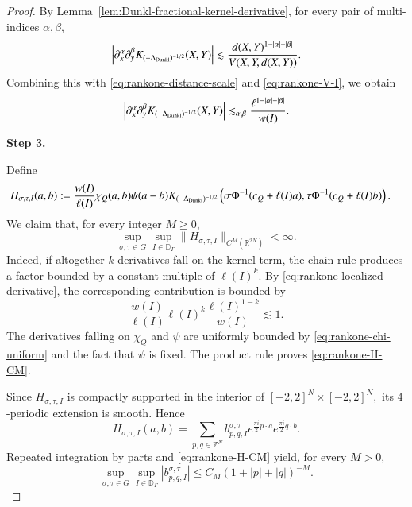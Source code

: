 \documentclass[12pt]{amsart}
\begin{document}
\begin{proof}
By Lemma~\ref{lem:Dunkl-fractional-kernel-derivative},
for every pair of multi-indices $\alpha,\beta$,
\[
\left|
\partial_x^\alpha\partial_y^\beta
K_{(-\Delta_{{\rm Dunkl}})^{-1/2}}(X,Y)
\right|
\lesssim
\frac{
d(X,Y)^{1-|\alpha|-|\beta|}
}{
V(X,Y,d(X,Y))
}.
\]
Combining this with
\eqref{eq:rankone-distance-scale} and
\eqref{eq:rankone-V-I}, we obtain
\begin{equation}\label{eq:rankone-localized-derivative}
\left|
\partial_x^\alpha\partial_y^\beta
K_{(-\Delta_{{\rm Dunkl}})^{-1/2}}(X,Y)
\right|
\lesssim_{\alpha,\beta}
\frac{
\ell^{1-|\alpha|-|\beta|}
}{
w(I)
}.
\end{equation}

\medskip
\noindent
\textbf{Step 3. }

Define
\begin{align}
H_{\sigma,\tau,I}(a,b)
:={}&
\frac{w(I)}{\ell(I)}
\chi_Q(a,b)\psi(a-b)
K_{(-\Delta_{{\rm Dunkl}})^{-1/2}}
\left(
\sigma\Phi^{-1}(c_Q+\ell(I)a),
\tau\Phi^{-1}(c_Q+\ell(I)b)
\right).
\label{eq:rankone-H}
\end{align}
We claim that, for every integer $M\geq0$,
\begin{equation}\label{eq:rankone-H-CM}
\sup_{\sigma,\tau\in G}
\sup_{I\in\mathbb D_\Gamma}
\|H_{\sigma,\tau,I}\|_{C^M(\mathbb R^{2N})}
<\infty.
\end{equation}
Indeed, if altogether $k$ derivatives fall on the kernel term, the
chain rule produces a factor bounded by a constant multiple of
$\ell(I)^k$. By \eqref{eq:rankone-localized-derivative},
the corresponding contribution is bounded by
\[
\frac{w(I)}{\ell(I)}
\ell(I)^k
\frac{\ell(I)^{1-k}}{w(I)}
\lesssim1.
\]
The derivatives falling on $\chi_Q$ and $\psi$ are uniformly bounded
by \eqref{eq:rankone-chi-uniform} and the fact that $\psi$ is fixed.
The product rule proves \eqref{eq:rankone-H-CM}.

Since $H_{\sigma,\tau,I}$ is compactly supported in the interior of
$
[-2,2]^N\times[-2,2]^N,
$
its $4$-periodic extension is smooth. Hence
\begin{equation}\label{eq:rankone-Fourier}
H_{\sigma,\tau,I}(a,b)
=
\sum_{p,q\in\mathbb Z^N}
b_{p,q,I}^{\sigma,\tau}
e^{\frac{\pi i}{2}p\cdot a}
e^{\frac{\pi i}{2}q\cdot b}.
\end{equation}
Repeated integration by parts and
\eqref{eq:rankone-H-CM} yield, for every $M>0$,
\begin{equation}\label{eq:rankone-b-rapid}
\sup_{\sigma,\tau\in G}
\sup_{I\in\mathbb D_\Gamma}
|b_{p,q,I}^{\sigma,\tau}|
\leq
C_M(1+|p|+|q|)^{-M}.
\end{equation}


\end{proof}
\end{document}
